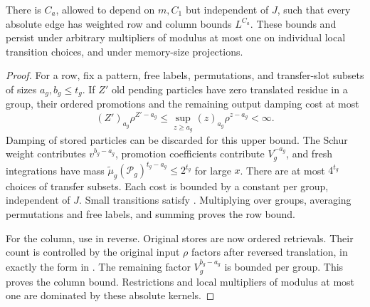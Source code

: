 \begin{lemma}\label{lem:memory-absolute}
There is $C_a$, allowed to depend on $m,C_1$ but independent
of $J$, such that every absolute edge has weighted row and
column bounds $L^{C_a}$.  These bounds and
 persist under arbitrary
multipliers of modulus at most one on individual local
transition choices, and under memory-size projections.
\end{lemma}

\begin{proof}
For a row, fix a pattern, free labels, permutations, and
transfer-slot subsets of sizes $a_g,b_g\le t_g$.  If $Z'$
old pending particles have zero translated residue in a
group, their ordered promotions and the remaining output
damping cost at most
\begin{equation}\label{eq:promotion-count}
 (Z')_{a_g}\rho^{Z'-a_g}
 \le\sup_{z\ge a_g}(z)_{a_g}\rho^{z-a_g}<\infty.
\end{equation}
Damping of stored particles can be discarded for this upper
bound.  The Schur weight contributes $v^{b_g-a_g}$, promotion
coefficients contribute $V_g^{-a_g}$, and fresh integrations
have mass $\widetilde\mu_g(\mathcal P_g)^{t_g-a_g}\le2^{t_g}$
for large $x$.  There are at most $4^{t_g}$ choices of transfer
subsets.  Each cost is bounded by a constant per group,
independent of $J$.  Small transitions satisfy
.  Multiplying over groups,
averaging permutations and free labels, and summing
 proves the row bound.

For the column, use  in reverse.  Original stores
are now ordered retrievals.  Their count is controlled by the
original input $\rho$ factors after reversed translation, in
exactly the form in .  The remaining
factor $V_g^{b_g-a_g}$ is bounded per group.  This proves the
column bound.  Restrictions and local multipliers of modulus
at most one are dominated by these absolute kernels.
\end{proof}

